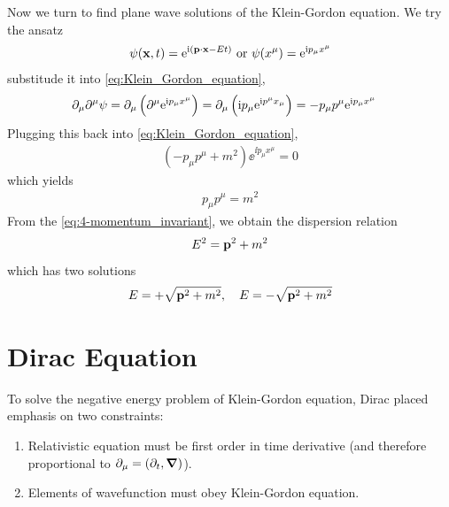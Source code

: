 Now we turn to find plane wave solutions of the Klein-Gordon equation. We try the ansatz
\begin{align}
    \psi(\mathbf{x},t) = \mathrm{e}^{\mathrm{i} (\mathbf{p} \cdot \mathbf{x} - E t)} \text{ or } \psi(x^ \mu) = \mathrm{e}^{\mathrm{i} p_ \mu x^ \mu}
\end{align}
substitude it into \cref{eq:Klein_Gordon_equation}, 
\begin{align}
    \partial_ \mu \partial^ \mu \psi &= \partial_ \mu \left( \partial^ \mu \mathrm{e}^{\mathrm{i} p_ \mu x^ \mu} \right) = \partial_ \mu \left(\mathrm{i} p_ \mu \mathrm{e}^{\mathrm{i} p^ \mu x_\mu}\right) = - p_ \mu p^ \mu \mathrm{e}^{\mathrm{i} p_ \mu x^ \mu} 
\end{align}
Plugging this back into \cref{eq:Klein_Gordon_equation},
\begin{align}
    \left(- p_ \mu p^ \mu + m^2 \right) \ee^{\ii p_ \mu x^ \mu} = 0
\end{align}
which yields 
\begin{align}
    p_ \mu p^ \mu = m^2
\end{align}
From the \cref{eq:4-momentum_invariant},
we obtain the dispersion relation
\begin{align}
    E^2 = \mathbf{p}^2 + m^2
\end{align}
which has two solutions
\begin{align}
    E = + \sqrt{\mathbf{p}^2 + m^2}, \quad E = - \sqrt{\mathbf{p}^2 + m^2}    
\end{align}





\section{Dirac Equation}

To solve the negative energy problem of Klein-Gordon equation, Dirac placed emphasis on two constraints: 
\begin{enumerate}
    \item Relativistic equation must be first order in time derivative (and therefore proportional to $\partial_ \mu = \left(\partial_t , \boldsymbol{\nabla}\right)$). 
    \item Elements of wavefunction must obey Klein-Gordon equation.
\end{enumerate}

